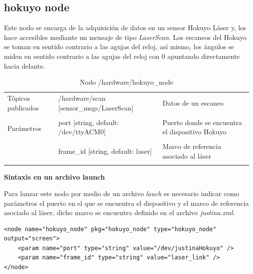 \documentclass[user_manual.tex]{subfiles}
\begin{document}
\subsection{hokuyo node}
Este nodo se encarga de la adquisición de datos en un sensor Hokuyo Láser y, los hace accesibles mediante un mensaje de tipo \textit{LaserScan}. Los escaneos del Hokuyo se toman en sentido contrario a las agujas del reloj, así mismo, los ángulos se miden en sentido contrario a las agujas del reloj con 0 apuntando directamente hacia delante.
\begin{table}[H]
\begin{center}
\begin{tabular}{|l|p{6.5cm}|p{4.5cm}|}%
\hline

Tópicos publicados
& /hardware/scan [sensor\_msgs/LaserScan] & Datos de un escaneo \\
& & \\
\hline

\multirow{2}{*}{Parámetros} 
&  port [string, default: /dev/ttyACM0] & Puerto donde se encuentra el dispositivo Hokuyo \\
& & \\
& frame\_id [string, default: laser]  & Marco de referencia asociado al láser \\
& & \\
\cline{1-3}

\end{tabular}
\caption{Nodo /hardware/hokuyo\_node}
\label{hokuyo node}
\end{center}
\end{table}

\textbf{Sintaxis en un archivo launch}

Para lanzar este nodo por medio de un archivo \textit{lauch} es necesario indicar como parámetros el puerto en el que se encuentra el dispositivo y el marco de referencia asociado al láser, dicho marco se encuentra definido en el archivo \textit{justina.xml}.\\
\begin{verbatim}
<node name="hokuyo_node" pkg="hokuyo_node" type="hokuyo_node" output="screen">
    <param name="port" type="string" value="/dev/justinaHokuyo" />
    <param name="frame_id" type="string" value="laser_link" />
</node>
\end{verbatim}

\end{document}
